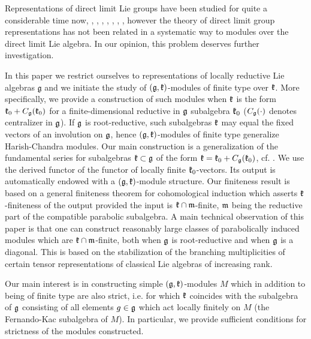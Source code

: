 \documentclass[12pt]{article}
\newcounter{theorem}
\renewcommand{\gg}{\mathfrak{g}}
\begin{document}
Representations of direct limit Lie groups have been studied for quite a considerable time now, \cite{Ha}, \cite{Ne}, \cite{O1}, \cite{O2}, \cite{NO}, \cite{W}, \cite{NRW}, however the theory of direct limit group representations has not been related in a systematic way to modules over the direct limit Lie algebra. In our opinion, this problem deserves further investigation.

In this paper we restrict ourselves to representations of locally reductive Lie algebras $\gg$ and we initiate the study of $(\frak g,\frak k)$-modules of finite type over $\frak k$. More specifically, we provide a construction of such modules when $\frak k$ is the form $\frak k_0 + C_{\frak g}(\frak k_0)$ for a finite-dimensional reductive in $\frak g$ subalgebra $\frak k_0$ ($C_{\frak g}(\cdot)$ denotes centralizer in $\frak g$).  If $\frak g$ is root-reductive, such subalgebras $\frak k$ may equal the fixed vectors of an involution on $\frak g$, hence $(\frak g,\frak k)$-modules of finite type generalize Harish-Chandra modules. Our main construction is a generalization of the fundamental series for subalgebras $\frak k\subset\frak g$ of the form $\frak k = \frak k_0 + C_{\frak g} (\frak k_0)$, cf. \cite{PZ2}.  We use the derived functor of the functor of locally finite $\frak k_0$-vectors. Its output is automatically endowed with a $(\frak g,\frak k)$-module structure.  Our finiteness result is based on a general finiteness theorem for cohomological induction which asserts $\frak k$-finiteness of the output provided the input is $\frak k\cap\frak m$-finite, $\frak m$ being the reductive part of the compatible parabolic subalgebra.  A main technical observation of this paper is that one can construct reasonably large classes of parabolically induced modules which are $\frak k\cap\frak m$-finite, both when $\frak g$ is root-reductive and when $\frak g$ is a diagonal. This is based on the stabilization of the branching multiplicities of certain tensor representations of classical Lie algebras of increasing rank.

Our main interest is in constructing simple $(\frak g,\frak k)$-modules $M$ which in addition to being of finite type are also strict, i.e. for which $\frak k$ coincides with the subalgebra of $\frak g$ consisting of all elements $g\in\frak g$ which act locally finitely on $M$ (the Fernando-Kac subalgebra of $M$). In particular, we provide sufficient conditions for strictness of the modules constructed.
\end{document}
